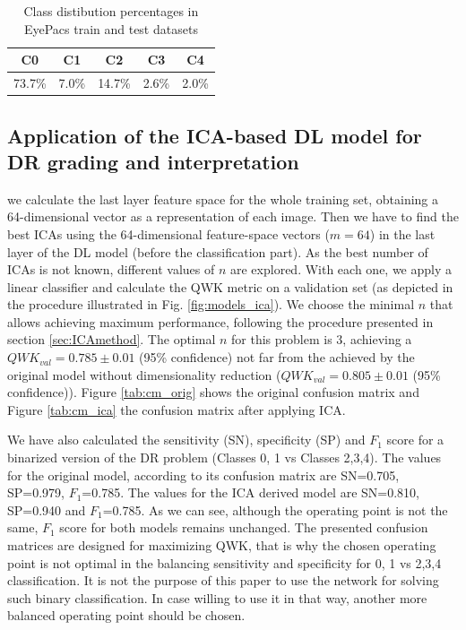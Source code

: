 \documentclass[review]{elsarticle}
\theoremstyle{definition} %
\theoremstyle{remark}
\begin{document}
\begin{table}[ht!]
	\centering
	\begin{tabular}{c c c c c } 
		\hline
		 C0 & C1 & C2 & C3 & C4 \\ [0.5ex] 
		\hline\hline
		 73.7\% & 7.0\% & 14.7\% & 2.6\% & 2.0\%\\
		\hline
	\end{tabular}
	\caption{Class distibution percentages in EyePacs train and test datasets}
	\label{class:tab:classperc}
\end{table}

\subsection{Application of the ICA-based DL model for DR grading and interpretation}

 we calculate the last layer feature space for the whole training set, obtaining a 64-dimensional vector as a representation of each image.
Then we have to find the best ICAs using the 64-dimensional feature-space vectors ($m=64$) in the last layer of the DL model (before the classification part). As the best number of ICAs is not known, different values of $n$ are explored. With each one, we apply a linear classifier and calculate the QWK metric on a validation set (as depicted in the procedure illustrated in Fig. \ref{fig:models_ica}). We choose the minimal $n$ that allows achieving maximum performance, following the procedure presented in section \ref{sec:ICAmethod}. The optimal $n$ for this problem is $3$, achieving a $QWK_{val} = 0.785 \pm 0.01$ (95\% confidence) not far from the achieved by the original model without dimensionality reduction ($QWK_{val} = 0.805 \pm 0.01$ (95\% confidence)). 
 Figure \ref{tab:cm_orig} shows the original confusion matrix and Figure \ref{tab:cm_ica} the confusion matrix after applying ICA. 




We have also calculated the sensitivity (SN), specificity (SP) and $F_1$ score for a binarized version of the DR problem (Classes 0, 1 vs Classes 2,3,4). The values for the original model, according to its confusion matrix are SN=0.705, SP=0.979, $F_1$=0.785. The values for the ICA derived model are SN=0.810, SP=0.940 and $F_1$=0.785. As we can see, although the operating point is not the same, $F_1$ score for both models remains unchanged. The presented confusion matrices are designed for maximizing QWK, that is why the chosen operating point is not optimal in the balancing sensitivity and specificity for 0, 1 vs 2,3,4 classification. It is not the purpose of this paper to use the network for solving such binary classification. In case willing to use it in that way, another more balanced operating point should be chosen.
\end{document}
